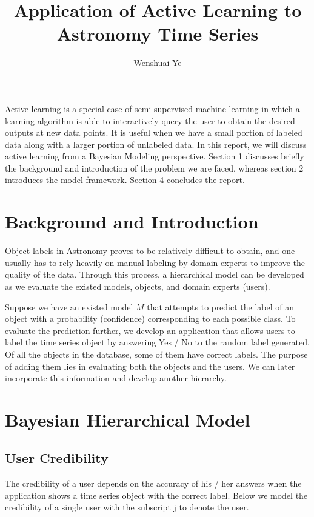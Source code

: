 \documentclass[a4paper,10pt]{article}
\title{Application of Active Learning to Astronomy Time Series}
\author{Wenshuai Ye}
\begin{document}
\maketitle

Active learning is a special case of semi-supervised machine learning in which a learning algorithm is able to interactively query the user to obtain the desired outputs at new data points. It is useful when we have a small portion of labeled data along with a larger portion of unlabeled data. In this report, we will discuss active learning from a Bayesian Modeling perspective. Section 1 discusses briefly the background and introduction of the problem we are faced, whereas section 2 introduces the model framework. Section 4 concludes the report.

\section{Background and Introduction}

Object labels in Astronomy proves to be relatively difficult to obtain, and one usually has to rely heavily on manual labeling by domain experts to improve the quality of the data. Through this process, a hierarchical model can be developed as we evaluate the existed models, objects, and domain experts (users). 

\hspace{0 mm}

\noindent Suppose we have an existed model $M$ that attempts to predict the label of an object with a probability (confidence) corresponding to each possible class. To evaluate the prediction further, we develop an application that allows users to label the time series object by answering Yes / No to the random label generated. Of all the objects in the database, some of them have correct labels. The purpose of adding them lies in evaluating both the objects and the users. We can later incorporate this information and develop another hierarchy.

\section{Bayesian Hierarchical Model}
\subsection{User Credibility}
The credibility of a user depends on the accuracy of his / her answers when the application shows a time series object with the correct label. Below we model the credibility of a single user with the subscript j to denote the user.
\end{document}

